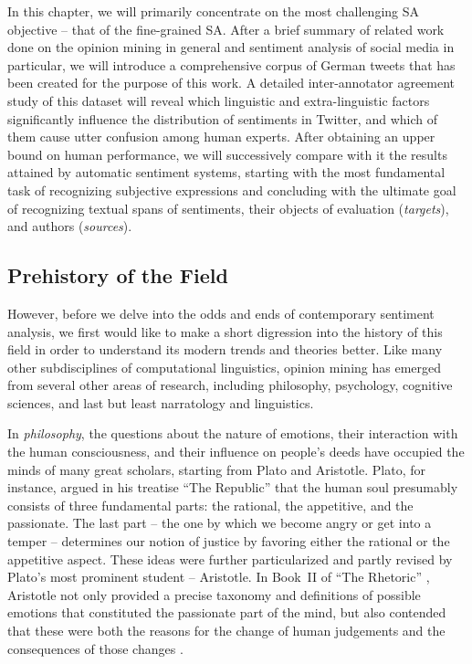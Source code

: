In this chapter, we will primarily concentrate on the most challenging
SA objective -- that of the fine-grained SA.  After a brief summary of
related work done on the opinion mining in general and sentiment
analysis of social media in particular, we will introduce a
comprehensive corpus of German tweets that has been created for the
purpose of this work.  A detailed inter-annotator agreement study of
this dataset will reveal which linguistic and extra-linguistic factors
significantly influence the distribution of sentiments in Twitter, and
which of them cause utter confusion among human experts.  After
obtaining an upper bound on human performance, we will successively
compare with it the results attained by automatic sentiment systems,
starting with the most fundamental task of recognizing subjective
expressions and concluding with the ultimate goal of recognizing
textual spans of sentiments, their objects of evaluation
(\emph{targets}), and authors (\emph{sources}).

\subsection{Prehistory of the Field}

However, before we delve into the odds and ends of contemporary
sentiment analysis, we first would like to make a short digression
into the history of this field in order to understand its modern
trends and theories better.  Like many other subdisciplines of
computational linguistics, opinion mining has emerged from several
other areas of research, including philosophy, psychology, cognitive
sciences, and last but least narratology and linguistics.

In \emph{philosophy}, the questions about the nature of emotions,
their interaction with the human consciousness, and their influence on
people's deeds have occupied the minds of many great scholars,
starting from Plato and Aristotle.  Plato, for instance, argued in his
treatise ``The Republic'' \citep[Book~IV]{Plato:91} that the human
soul presumably consists of three fundamental parts: the rational, the
appetitive, and the passionate.  The last part -- the one by which we
become angry or get into a temper -- determines our notion of justice
by favoring either the rational or the appetitive aspect.  These ideas
were further particularized and partly revised by Plato's most
prominent student -- Aristotle.  In Book~II of ``The Rhetoric''
\citep{Aristotle:54}, Aristotle not only provided a precise taxonomy
and definitions of possible emotions that constituted the passionate
part of the mind, but also contended that these were both the reasons
for the change of human judgements and the consequences of those
changes \cite[cf.][p. 157]{Leighton:82}.

